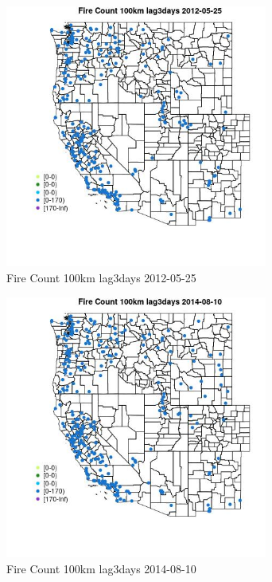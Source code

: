 \begin{figure} 
\centering  
\includegraphics[width=0.77\textwidth]{Code_Outputs/Report_ML_input_PM25_Step4_part_e_de_duplicated_aves_compiled_2019-05-18wNAs_MapObsFire_Count_100km_lag3days2012-05-25.jpg} 
\caption{\label{fig:Report_ML_input_PM25_Step4_part_e_de_duplicated_aves_compiled_2019-05-18wNAsMapObsFire_Count_100km_lag3days2012-05-25}Fire Count 100km lag3days 2012-05-25} 
\end{figure} 
 

\begin{figure} 
\centering  
\includegraphics[width=0.77\textwidth]{Code_Outputs/Report_ML_input_PM25_Step4_part_e_de_duplicated_aves_compiled_2019-05-18wNAs_MapObsFire_Count_100km_lag3days2014-08-10.jpg} 
\caption{\label{fig:Report_ML_input_PM25_Step4_part_e_de_duplicated_aves_compiled_2019-05-18wNAsMapObsFire_Count_100km_lag3days2014-08-10}Fire Count 100km lag3days 2014-08-10} 
\end{figure} 
 

